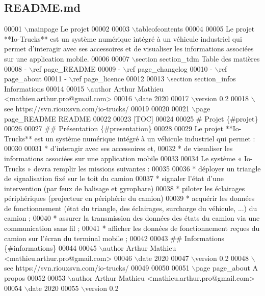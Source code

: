 \hypertarget{_r_e_a_d_m_e_8md_source}{}\subsection{R\+E\+A\+D\+M\+E.\+md}

\begin{DoxyCode}
00001 \(\backslash\)mainpage Le projet 
00002 
00003 \(\backslash\)tableofcontents
00004 
00005 Le projet **Io-Trucks** est un système numérique intégré à un véhicule industriel qui permet
       d'interagir avec ses accessoires et de visualiser les informations associées sur une application mobile.
00006 
00007 \(\backslash\)section section\_tdm Table des matières
00008 - \(\backslash\)ref page\_README
00009 - \(\backslash\)ref page\_changelog
00010 - \(\backslash\)ref page\_about
00011 - \(\backslash\)ref page\_licence
00012 
00013 \(\backslash\)section section\_infos Informations
00014 
00015 \(\backslash\)author Arthur Mathieu <mathieu.arthur.pro@gmail.com>
00016 \(\backslash\)date 2020
00017 \(\backslash\)version 0.2
00018 \(\backslash\)see https://svn.riouxsvn.com/io-trucks/
00019 
00020 
00021 \(\backslash\)page page\_README README
00022 
00023 [TOC]
00024 
00025 # Projet \{#projet\}
00026 
00027 ## Présentation \{#presentation\}
00028 
00029 Le projet **Io-Trucks** est un système numérique intégré à un véhicule industriel qui permet :
00030 
00031 * d'interagir avec ses accessoires et,
00032 * de visualiser les informations associées sur une application mobile
00033 
00034 Le système « Io-Trucks » devra remplir les missions suivantes :
00035 
00036 * déployer un triangle de signalisation fixé sur le toit du camion
00037 * signaler l'état d'une intervention (par feux de balisage et gyrophare)
00038 * piloter les éclairages périphériques (projecteur en périphérie du camion)
00039 * acquérir les données de fonctionnement (état du triangle, des éclairages, surcharge du véhicule,
       ...) du camion ;
00040 * assurer la transmission des données des états du camion via une communication sans fil ;
00041 * afficher les données de fonctionnement reçues du camion sur l'écran du terminal mobile ;
00042 
00043 ## Informations \{#informations\}
00044 
00045 \(\backslash\)author Arthur Mathieu <mathieu.arthur.pro@gmail.com>
00046 \(\backslash\)date 2020
00047 \(\backslash\)version 0.2
00048 \(\backslash\)see https://svn.riouxsvn.com/io-trucks/
00049 
00050 
00051 \(\backslash\)page page\_about A propos
00052 
00053 \(\backslash\)author Arthur Mathieu <mathieu.arthur.pro@gmail.com>
00054 \(\backslash\)date 2020
00055 \(\backslash\)version 0.2

\end{DoxyCode}

